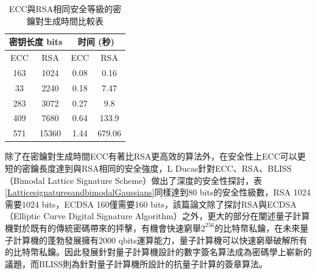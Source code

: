 				\begin{table}[!htbp]
				\centering
				\caption{ECC與RSA相同安全等級的密鑰對生成時間比較表\supercite{Performancecomparisonofellipticcurveandrsadigitalsignatures}}
				\label{ECCtime}
				\begin{tabular}{|c|c|c|c|}
				\hline
				\multicolumn{2}{|c|}{密钥长度 bits} & \multicolumn{2}{c|}{时间 (秒)} \\ \hline
				ECC & RSA & ECC & RSA \\ \hline
				163 & 1024 & 0.08 & 0.16 \\ \hline
				33 & 2240 & 0.18 & 7.47 \\ \hline
				283 & 3072 & 0.27 & 9.8 \\ \hline
				409 & 7680 & 0.64 & 133.9 \\ \hline
				571 & 15360 & 1.44 & 679.06 \\ \hline
				\end{tabular}
				\end{table}

				除了在密鑰對生成時間ECC有著比RSA更高效的算法外，在安全性上ECC可以更短的密鑰長度達到與RSA相同的安全強度，L Ducas針對ECC、RSA、BLISS （Bimodal Lattice Signature Scheme）\supercite{LatticesignaturesandbimodalGaussians}做出了深度的安全性探討\supercite{LatticesignaturesandbimodalGaussians}，表\ref{LatticesignaturesandbimodalGaussians}同樣達到80 bits的安全性級數，RSA 1024需要1024 bits，ECDSA 160\supercite{DeploymentsofEllipticCurveCryptography}僅需要160 bits，該篇論文除了探討RSA與ECDSA（Elliptic Curve Digital Signature Algorithm）之外，更大的部分在闡述量子計算機對於既有的傳統密碼帶來的抨擊，有機會快速窮舉$2^{256}$的比特幣私鑰，在未來量子計算機的蓬勃發展擁有2000 qbits運算能力，量子計算機可以快速窮舉破解所有的比特幣私鑰。因此發展針對量子計算機設計的數字簽名算法成為密碼學上嶄新的議題，而BLISS則為針對量子計算機所設計的抗量子計算的簽章算法。

